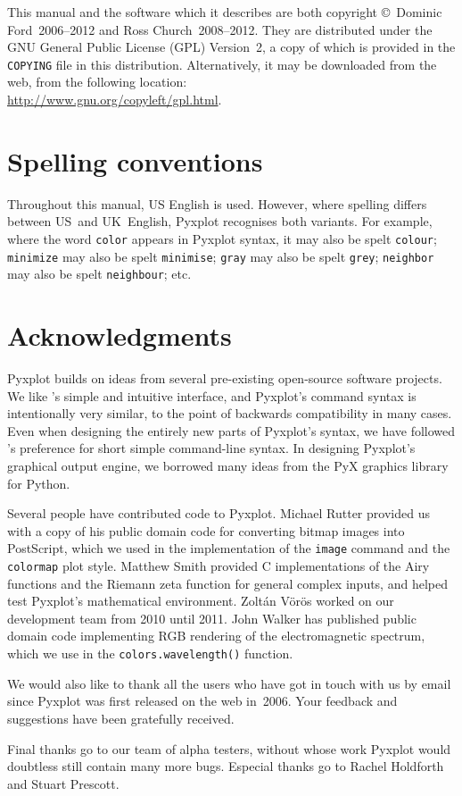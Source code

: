 This manual and the software which it describes are both copyright \copyright\
Dominic Ford~2006--2012 and Ross Church~2008--2012. They are distributed under
the GNU General Public License (GPL) Version~2, a copy of which is provided in
the {\tt COPYING} file in this distribution.\index{General Public
License}\index{license} Alternatively, it may be downloaded from the web, from
the following location:\\ \url{http://www.gnu.org/copyleft/gpl.html}.

\section{Spelling conventions}

Throughout this manual, US English is used. However, where spelling differs
between US~and UK~English, Pyxplot recognises both variants. For example, where
the word \texttt{color} appears in Pyxplot syntax, it may also be spelt
\texttt{colour}; \texttt{minimize} may also be spelt \texttt{minimise};
\texttt{gray} may also be spelt \texttt{grey}; \texttt{neighbor} may also be
spelt \texttt{neighbour}; etc.

\section{Acknowledgments}

Pyxplot builds on ideas from several pre-existing open-source software
projects. We like \gnuplot's simple and intuitive interface, and Pyxplot's
command syntax is intentionally very similar, to the point of backwards
compatibility in many cases. Even when designing the entirely new parts of
Pyxplot's syntax, we have followed \gnuplot's preference for short simple
command-line syntax. In designing Pyxplot's graphical output engine, we
borrowed many ideas from the PyX\index{PyX} graphics library for Python.

Several people have contributed code to Pyxplot. Michael Rutter provided us 
with a copy of his public domain code for converting bitmap images into
PostScript, which we used in the implementation of the {\tt image} command and
the {\tt colormap} plot style. Matthew Smith provided C implementations of the
Airy functions and the Riemann zeta function for general complex inputs, and
helped test Pyxplot's mathematical environment. Zolt\'an V\"or\"os worked on
our development team from 2010 until 2011.  John Walker has published public
domain code implementing RGB rendering of the electromagnetic spectrum, which
we use in the {\tt colors.\-wave\-length()} function.

We would also like to thank all the users who have got in touch with us by
email since Pyxplot was first released on the web in~2006. Your feedback and
suggestions have been gratefully received.

Final thanks go to our team of alpha testers, without whose work Pyxplot would
doubtless still contain many more bugs.  Especial thanks go to Rachel Holdforth
and Stuart Prescott.

